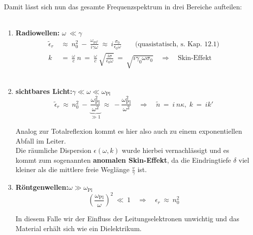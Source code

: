 \ \\
Damit lässt sich nun das gesamte Frequenzspektrum  in drei Bereiche aufteilen:\\
\ \\
\begin{enumerate}
\item \textbf{Radiowellen:} \qquad\qquad $\omega \ \ll \gamma$\\

\begin{align*}
\tilde{\epsilon}_r \ &\approx \ n_0^2 \ - \ \frac{\omega_{\text{Pl}^2}}{i\gamma\omega} \ \approx \ i \frac{\sigma_0}{\epsilon_0\omega} \qquad \text{(quasistatisch, s. Kap. 12.1)}\\
k \ &= \ \frac{\omega}{c} \ n  \ = \ \frac{\omega}{c} \ \sqrt{\frac{i\sigma}{\epsilon_0\omega}} \ = \ \sqrt{i\gamma_0\omega\sigma_0} \quad \Rightarrow \quad \text{Skin-Effekt}
\end{align*}
\ \\

\item \textbf{sichtbares Licht:}\qquad\quad $\gamma\ll\omega\ll\omega_{\text{Pl}}$\\

\begin{equation*}
\tilde{\epsilon}_r \ \approx \ n_0^2 \ - \ \underbrace{\frac{\omega_{\text{Pl}}^2}{\omega^2}}_{\gg 1} \ \approx \ - \frac{\omega_{\text{Pl}}^2}{\omega^2} \quad \Rightarrow\quad \tilde{n} \ = \ i \ n \kappa, \; k \ = \ i k'
\end{equation*}
 
Analog zur Totalreflexion kommt es hier also auch zu einem exponentiellen Abfall im Leiter.\\
Die räumliche Dispersion $\epsilon(\omega,k)$ wurde hierbei vernachlässigt und es kommt zum sogenannten \textbf{anomalen Skin-Effekt}, da die Eindringtiefe $\delta$ viel kleiner als die mittlere freie Weglänge $\frac{v}{\gamma}$ ist.\\ 

\item \textbf{Röntgenwellen:}\qquad\qquad $\omega \gg \omega_{\text{Pl}}$\\

\begin{equation*}
\left(\frac{\omega_{\text{Pl}}}{\omega}\right)^2 \ \ll \ 1 \quad\Rightarrow\quad \epsilon_r \ \approx \ n_0^2
\end{equation*}

In diesem Falle wir der Einfluss der Leitungselektronen unwichtig und das Material erhält sich wie ein Dielektrikum.
\end{enumerate}

